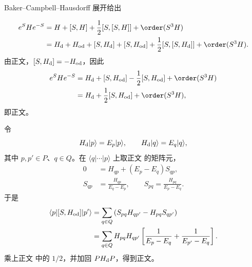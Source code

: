\begin{derivation}
Baker--Campbell--Hausdorff 展开给出

\begin{align*}
 e^SHe^{-S}
 &=H+[S,H]+\frac12[S,[S,H]]+\order(S^3H)\\
 &=H_{\rm d}+H_{\rm od}+[S,H_{\rm d}]+[S,H_{\rm od}]
 +\frac12[S,[S,H_{\rm d}]]+\order(S^3H).
\end{align*}
由正文，$[S,H_{\rm d}]=-H_{\rm od}$，因此
\begin{align*}
 e^SHe^{-S}
 &=H_{\rm d}+[S,H_{\rm od}]
 -\frac12[S,H_{\rm od}]+\order(S^3H)\\
 &=H_{\rm d}+\frac12[S,H_{\rm od}]+\order(S^3H),
\end{align*}
即正文。

令
\begin{equation*}
 H_{\rm d}|p\rangle=E_p|p\rangle,
 \qquad
 H_{\rm d}|q\rangle=E_q|q\rangle,
\end{equation*}
其中 $p,p'\in P$、$q\in Q$。在 $\langle q|\cdots|p\rangle$ 上取正文 的矩阵元，
\begin{align*}
 0&=H_{qp}+(E_p-E_q)S_{qp},\\
 S_{qp}&=\frac{H_{qp}}{E_q-E_p},
 \qquad
 S_{pq}=\frac{H_{pq}}{E_p-E_q}.
\end{align*}
于是
\begin{align*}
 \langle p|[S,H_{\rm od}]|p'\rangle
 &=\sum_{q\in Q}
 \left(S_{pq}H_{qp'}-H_{pq}S_{qp'}\right)\\
 &=\sum_{q\in Q}H_{pq}H_{qp'}
 \left[
 \frac1{E_p-E_q}
 +\frac1{E_{p'}-E_q}
 \right].
\end{align*}
乘上正文 中的 $1/2$，并加回 $P H_{\rm d}P$，得到正文。
\end{derivation}

